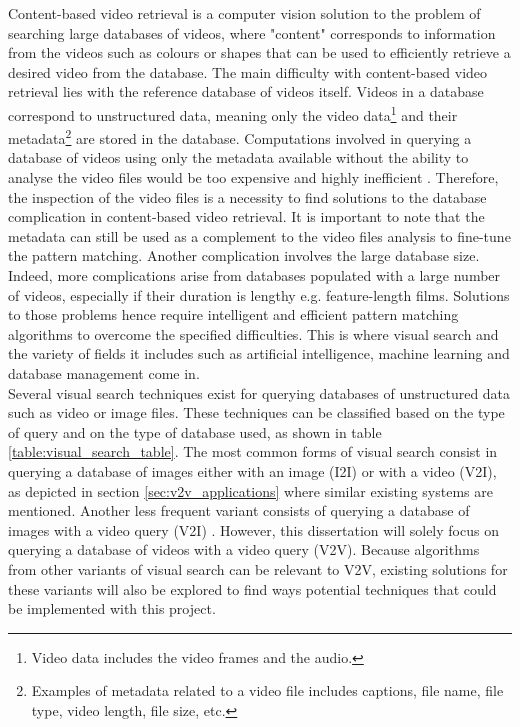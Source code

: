 Content-based video retrieval is a computer vision solution to the problem of searching large databases of videos, where "content" corresponds to information from the videos such as colours or shapes that can be used to efficiently retrieve a desired video from the database. The main difficulty with content-based video retrieval lies with the reference database of videos itself. Videos in a database correspond to unstructured data, meaning only the video data\footnote{Video data includes the video frames and the audio.} and their metadata\footnote{Examples of metadata related to a video file includes captions, file name, file type, video length, file size, etc.} are stored in the database. Computations involved in querying a database of videos using only the metadata available without the ability to analyse the video files would be too expensive and highly inefficient \cite{patel2012}. Therefore, the inspection of the video files is a necessity to find solutions to the database complication in content-based video retrieval. It is important to note that the metadata can still be used as a complement to the video files analysis to fine-tune the pattern matching. Another complication involves the large database size. Indeed, more complications arise from databases populated with a large number of videos, especially if their duration is lengthy e.g. feature-length films. Solutions to those problems hence require intelligent and efficient pattern matching algorithms to overcome the specified difficulties. This is where visual search and the variety of fields it includes such as artificial intelligence, machine learning and database management come in.\\

Several visual search techniques exist for querying databases of unstructured data such as video or image files. These techniques can be classified based on the type of query and on the type of database used, as shown in table \ref{table:visual_search_table}. The most common forms of visual search consist in querying a database of images either with an image (I2I) or with a video (V2I), as depicted in section \ref{sec:v2v_applications} where similar existing systems are mentioned. Another less frequent variant consists of querying a database of images with a video query (V2I) \cite{araujo2017i2v}. However, this dissertation will solely focus on querying a database of videos with a video query (V2V). Because algorithms from other variants of visual search can be relevant to V2V, existing solutions for these variants will also be explored to find ways potential techniques that could be implemented with this project.\\

